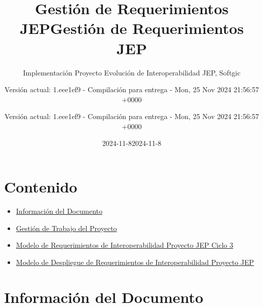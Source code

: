 \documentclass[
  paper=a4,
  ,captions=tableheading
]{scrartcl}
\title{Gestión de Requerimientos JEP}
\subtitle{Implementación Proyecto Evolución de Interoperabilidad JEP,
Softgic}
\author{Versión actual: 1.eee1ef9 - Compilación para entrega - Mon, 25
Nov 2024 21:56:57 +0000}
\date{2024-11-8}
\title{Gestión de Requerimientos JEP}
\author{Versión actual: 1.eee1ef9 - Compilación para entrega - Mon, 25
Nov 2024 21:56:57 +0000}
\date{2024-11-8}
\providecommand{\tightlist}{%
  \setlength{\itemsep}{0pt}\setlength{\parskip}{0pt}}
\begin{document}
\begin{titlepage}
\newcommand{\colorRule}[3][black]{\textcolor[HTML]{#1}{\rule{#2}{#3}}}
\end{titlepage}
\restoregeometry
{}




\section{Contenido}\label{sec:contenido}

\begin{itemize}
\tightlist
\item
  \hyperref[informaciuxf3n-del-documento]{Información del Documento}
\item
  \hyperref[gestiuxf3n-de-trabajo-del-proyecto]{Gestión de Trabajo del
  Proyecto}
\item
  \hyperref[modelo-de-requerimientos-de-interoperabilidad-proyecto-jep-ciclo-3]{Modelo
  de Requerimientos de Interoperabilidad Proyecto JEP Ciclo 3}
\item
  \hyperref[modelo-de-despliegue-de-requerimientos-de-interoperabilidad-proyecto-jep]{Modelo
  de Despliegue de Requerimientos de Interoperabilidad Proyecto JEP}
\end{itemize}

\newpage

\section{Información del
Documento}\label{sec:informaciuxf3n-del-documento}
\end{document}
